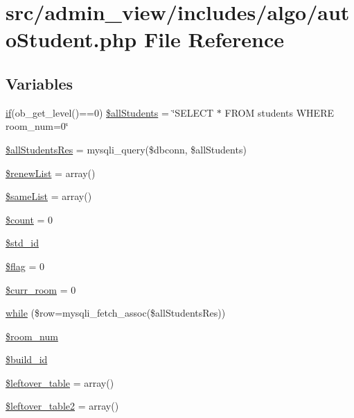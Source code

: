 \hypertarget{autoStudent_8php}{\section{src/admin\-\_\-view/includes/algo/auto\-Student.php \-File \-Reference}
\label{autoStudent_8php}
}
\subsection*{\-Variables}
\begin{DoxyCompactItemize}
\item 
\hyperlink{updateBenchDB_8php_a0c1f2915e12defa9f4d515347d884dee}{if}(ob\-\_\-get\-\_\-level()==0) \hyperlink{autoStudent_8php_acdd85a1abce7d32e53f2028aef2fdf30}{\$all\-Students} = \char`\"{}\-S\-E\-L\-E\-C\-T $\ast$ \-F\-R\-O\-M students \-W\-H\-E\-R\-E room\-\_\-num=0\char`\"{}
\item 
\hyperlink{autoStudent_8php_a5b42ae37453b4cb0a7b66ecf7f835c1b}{\$all\-Students\-Res} = mysqli\-\_\-query(\$dbconn, \$all\-Students)
\item 
\hyperlink{autoStudent_8php_a4b86be10feafcf37058c5a121b5fff28}{\$renew\-List} = array()
\item 
\hyperlink{autoStudent_8php_a9f9bc0c3bc8c3e3f16ec676735e123e8}{\$same\-List} = array()
\item 
\hyperlink{autoStudent_8php_af789423037bbc89dc7c850e761177570}{\$count} = 0
\item 
\hyperlink{autoStudent_8php_aac8edac502b6ed1fc852e8735ae424c2}{\$std\-\_\-id}
\item 
\hyperlink{autoStudent_8php_acf5d6dd3ee125abb9a2523b30bc47d02}{\$flag} = 0
\item 
\hyperlink{autoStudent_8php_a8595546d7518e1e6d8955325b0f74995}{\$curr\-\_\-room} = 0
\item 
\hyperlink{autoStudent_8php_a5814f5c1f5fabe3c16fc34e62a376cfb}{while} (\$row=mysqli\-\_\-fetch\-\_\-assoc(\$all\-Students\-Res))
\item 
\hyperlink{autoStudent_8php_ac8f3b2b9a28b7619de496a616ba2de94}{\$room\-\_\-num}
\item 
\hyperlink{autoStudent_8php_a6a8268a00832c2b9fb19639cef3b55c3}{\$build\-\_\-id}
\item 
\hyperlink{autoStudent_8php_ae55d8d34900566c9493c0acabfdeee48}{\$leftover\-\_\-table} = array()
\item 
\hyperlink{autoStudent_8php_a08b673911720e8532a341a87be7d7f68}{\$leftover\-\_\-table2} = array()

\end{DoxyCompactItemize}
